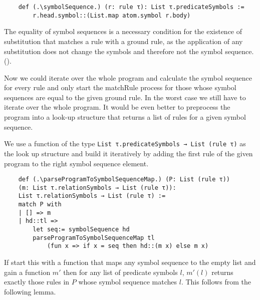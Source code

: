\begin{lstlisting}
    def (.\symbolSequence.) (r: rule τ): List τ.predicateSymbols := 
        r.head.symbol::(List.map atom.symbol r.body)

\end{lstlisting}

The equality of symbol sequences is a necessary condition for the existence of substitution that matches a rule with a ground rule, as the application of any substitution does not change the symbols and therefore not the symbol sequence. (\symbolSequenceNotEq).

Now we could iterate over the whole program and calculate the symbol sequence for every rule and only start the matchRule process for those whose symbol sequences are equal to the given ground rule. In the worst case we still have to iterate over the whole program. It would be even better to preprocess  the program into a look-up structure that returns a list of rules for a given symbol sequence.

We use a function of the type \lstinline|List τ.predicateSymbols → List (rule τ)| as the look up structure and build it iteratively by adding the first rule of the given program to the right symbol sequence element.

\begin{lstlisting}
    def (.\parseProgramToSymbolSequenceMap.) (P: List (rule τ)) 
    (m: List τ.relationSymbols → List (rule τ)): 
    List τ.relationSymbols → List (rule τ) :=
    match P with
    | [] => m
    | hd::tl =>
        let seq:= symbolSequence hd
        parseProgramToSymbolSequenceMap tl 
            (fun x => if x = seq then hd::(m x) else m x)
\end{lstlisting}

If start this with a function that maps any symbol sequence to the empty list and gain a function $m'$ then for any list of predicate symbols $l$, $m'(l)$ returns exactly those rules in $P$ whose symbol sequence matches $l$. This follows from the following lemma.

